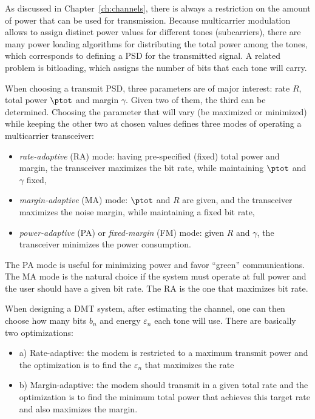 As discussed in Chapter~\ref{ch:channels}, there is always a restriction on the amount of power that can be used for transmission. Because multicarrier modulation allows to assign distinct power values for different tones (subcarriers), there are many power loading algorithms for distributing the total power among the tones, which corresponds to defining a PSD for the transmitted signal. A related problem is bitloading, which assigns the number of bits that each tone will carry.

When choosing a transmit PSD, three parameters are of major interest: rate $R$, total power $\ptot$ and margin $\gamma$. Given two of them, the third can be determined. Choosing the parameter that will vary (be maximized or minimized) while keeping the other two at chosen values defines three modes of operating a 
multicarrier transceiver:
\begin{itemize}
\item \emph{rate-adaptive} (RA) mode: having pre-specified (fixed) total power and margin, the transceiver maximizes the bit rate, while
maintaining $\ptot$ and $\gamma$ fixed,
\item \emph{margin-adaptive} (MA) mode: $\ptot$ and $R$ are given, and the transceiver maximizes the noise margin, while maintaining a fixed bit rate,
\item \emph{power-adaptive} (PA) or \emph{fixed-margin} (FM) mode: given $R$ and $\gamma$, the
transceiver minimizes the power consumption.
\end{itemize}

The PA mode is useful for minimizing power and favor ``green'' communications. The MA mode is the natural choice if the system must operate at full power and the user should have a given bit rate. The RA is the one that maximizes bit rate.



When designing a DMT system, after estimating the channel, one can then choose how many bits $b_n$ and energy $\varepsilon_n$ each tone will use.  There are basically two optimizations:
\begin{itemize}
	\item a) Rate-adaptive: the modem is restricted to a maximum transmit power and the optimization is to find the $\varepsilon_n$ that maximizes the rate
	\item b) Margin-adaptive: the modem should transmit in a given total rate and the optimization is to find the minimum total power that achieves this target rate and also maximizes the margin.
\end{itemize}

